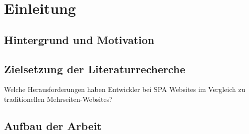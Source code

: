 
\section{Einleitung}


\subsection{Hintergrund und Motivation}

\subsection{Zielsetzung der Literaturrecherche}
Welche Herausforderungen haben Entwickler bei \ac{SPA} Websites im Vergleich zu traditionellen Mehrseiten-Websites?

\subsection{Aufbau der Arbeit}
